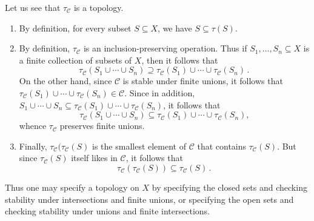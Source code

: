 \begin{nul}
	Let us see that $\tau_{\mathscr{C}}$ is a topology.
	\begin{enumerate}
		\item By definition, for every subset $S \subseteq X$, we have $S \subseteq \tau(S)$.
		\item By definition, $\tau_{\mathscr{C}}$ is an inclusion-preserving operation.
			Thus if $S_1, \dots, S_n \subseteq X$ is a finite collection of subsets of $X$, then it follows that 
			\[
				\tau_{\mathscr{C}}(S_1 \cup \cdots \cup S_n) \supseteq \tau_{\mathscr{C}}(S_1) \cup \cdots \cup \tau_{\mathscr{C}}(S_n) \period
			\]
			On the other hand, since $\mathscr{C}$ is stable under finite unions, it follows that $\tau_{\mathscr{C}}(S_1) \cup \cdots \cup \tau_{\mathscr{C}}(S_n) \in \mathscr{C}$.
			Since in addition, $S_1 \cup \cdots \cup S_n \subseteq \tau_{\mathscr{C}}(S_1) \cup \cdots \cup \tau_{\mathscr{C}}(S_n)$, it follows%
			that 
			\[
				\tau_{\mathscr{C}}(S_1 \cup \cdots \cup S_n) \subseteq \tau_{\mathscr{C}}(S_1) \cup \cdots \cup \tau_{\mathscr{C}}(S_n) \comma
			\]
			whence $\tau_{\mathscr{C}}$ preserves finite unions.
		\item Finally, $\tau_{\mathscr{C}}(\tau_{\mathscr{C}}(S)$ is the smallest element of $\mathscr{C}$ that contains $\tau_{\mathscr{C}}(S)$.
			But since $\tau_{\mathscr{C}}(S)$ itself likes in $\mathscr{C}$, it follows that
			\[
				\tau_{\mathscr{C}}(\tau_{\mathscr{C}}(S)) \subseteq \tau_{\mathscr{C}}(S) \period
			\]
	\end{enumerate}

	Thus one may specify a topology on $X$ by specifying the closed sets and checking stability under intersections and finite unions, or specifying the open sets and checking stability under unions and finite intersections.
\end{nul}

